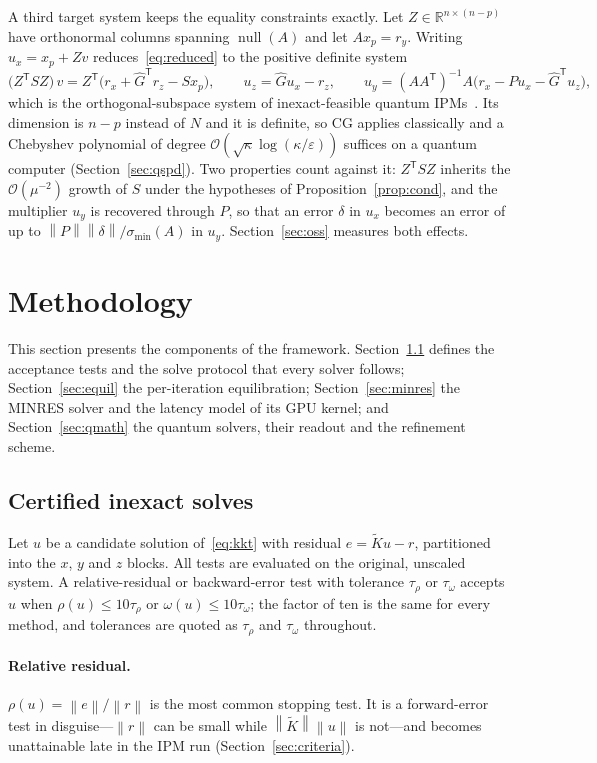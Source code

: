 \documentclass[11pt]{article}
\theoremstyle{definition}
\newcommand{\R}{\mathbb{R}}
\newcommand{\norm}[1]{\left\lVert #1 \right\rVert}
\newcommand{\Kt}{\tilde K}
\newcommand{\eps}{\varepsilon}
\newcommand{\Ghat}{\hat G}
\newcommand{\T}{^{\mathsf T}}
\newcommand{\bigO}{\mathcal{O}}
\begin{document}
A third target system keeps the equality constraints exactly. Let $Z\in\R^{n\times(n-p)}$ have orthonormal columns spanning $\operatorname{null}(A)$ and let $Ax_p=r_y$. Writing $u_x=x_p+Zv$ reduces~\eqref{eq:reduced} to the positive definite system
\begin{equation}\label{eq:oss}
\big(Z\T SZ\big)\,v = Z\T\big(r_x+\Ghat\T r_z-Sx_p\big),\qquad u_z=\Ghat u_x-r_z,\qquad u_y=(AA\T)^{-1}A\big(r_x-Pu_x-\Ghat\T u_z\big),
\end{equation}
which is the orthogonal-subspace system of inexact-feasible quantum IPMs~\cite{augustino2023qipm,wu2023inexact}. Its dimension is $n-p$ instead of $N$ and it is definite, so CG applies classically and a Chebyshev polynomial of degree $\bigO(\sqrt{\kappa}\log(\kappa/\eps))$ suffices on a quantum computer (Section~\ref{sec:qspd}). Two properties count against it: $Z\T SZ$ inherits the $\bigO(\mu^{-2})$ growth of $S$ under the hypotheses of Proposition~\ref{prop:cond}, and the multiplier $u_y$ is recovered through $P$, so that an error $\delta$ in $u_x$ becomes an error of up to $\norm{P}\norm{\delta}/\sigma_{\min}(A)$ in $u_y$. Section~\ref{sec:oss} measures both effects.

\section{Methodology}\label{sec:method}
This section presents the components of the framework. Section~\ref{sec:accept} defines the acceptance tests and the solve protocol that every solver follows; Section~\ref{sec:equil} the per-iteration equilibration; Section~\ref{sec:minres} the MINRES solver and the latency model of its GPU kernel; and Section~\ref{sec:qmath} the quantum solvers, their readout and the refinement scheme.

\subsection{Certified inexact solves}\label{sec:accept}
Let $u$ be a candidate solution of~\eqref{eq:kkt} with residual $e=\Kt u-r$, partitioned into the $x$, $y$ and $z$ blocks. All tests are evaluated on the original, unscaled system. A relative-residual or backward-error test with tolerance $\tau_\rho$ or $\tau_\omega$ accepts $u$ when $\rho(u)\le10\tau_\rho$ or $\omega(u)\le10\tau_\omega$; the factor of ten is the same for every method, and tolerances are quoted as $\tau_\rho$ and $\tau_\omega$ throughout.

\paragraph{Relative residual.} $\rho(u)=\norm{e}/\norm{r}$ is the most common stopping test. It is a forward-error test in disguise---$\norm{r}$ can be small while $\norm{\Kt}\norm{u}$ is not---and becomes unattainable late in the IPM run (Section~\ref{sec:criteria}).
\end{document}
